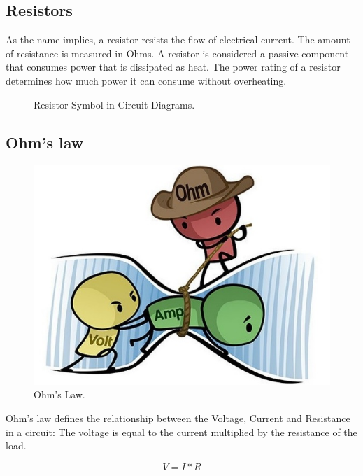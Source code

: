 \subsection{Resistors}

As the name implies, a resistor resists the flow of electrical current. The
amount of resistance is measured in Ohms. A resistor is considered a passive
component that consumes power that is dissipated as heat. The power rating of a
resistor determines how much power it can consume without overheating.

\begin{figure}[!ht]
    \centering
    
    \caption{Resistor Symbol in Circuit Diagrams.} \label{fig:resistor}
\end{figure}

\subsection{Ohm's law}

\begin{figure}[!ht]
	\centering
	\includegraphics{images/ohms_law_cartoon.png}
	\caption{Ohm's Law.} \label{fig:ohms_law_cartoon}
\end{figure}

Ohm's law defines the relationship between the Voltage, Current and Resistance
in a circuit: The voltage is equal to the current multiplied by the resistance
of the load. 

\begin{displaymath}\label{eq:ohm}
    V=I*R
\end{displaymath}

